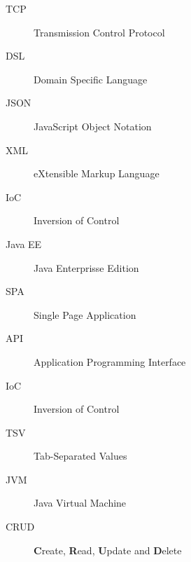 \begin{Glossary}
\begin{description}
\item[TCP]Transmission Control Protocol
\item[DSL]Domain Specific Language
\item[JSON]JavaScript Object Notation
\item[XML]eXtensible Markup Language
\item[IoC]Inversion of Control
\item[Java EE]Java Enterprisse Edition
\item[SPA]Single Page Application
\item[API]Application Programming Interface
\item[IoC]Inversion of Control
\item[TSV]Tab-Separated Values
\item[JVM]Java Virtual Machine
\item[CRUD]\textbf{C}reate, \textbf{R}ead, \textbf{U}pdate and \textbf{D}elete
\end{description}
\end{Glossary}